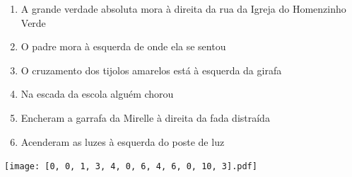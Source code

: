 \documentclass[12pt]{article}
\begin{document}
		 

\pagebreak


	\begin{enumerate}
		  \sffamily %
		  \large %


\vfill \item
A grande verdade absoluta mora	%
à direita
da rua da Igreja do Homenzinho Verde	%

\vfill \item
O padre mora	%
à esquerda
de onde ela se sentou	%

\vfill \item
O cruzamento dos tijolos amarelos está	%
à esquerda
da girafa	%

\vfill \item
Na escada da escola	%
alguém chorou	%

\vfill \item
Encheram a garrafa da Mirelle	%
à direita
da fada distraída	%

\vfill \item
Acenderam as luzes	%
à esquerda
do poste de luz	%
	\end{enumerate}
		  
		  \hfill

		  \vfill

\texttt{[image: [0, 0, 1, 3, 4, 0, 6, 4, 6, 0, 10, 3].pdf]}


	\hfill	  	  


\pagebreak			
\end{document}
